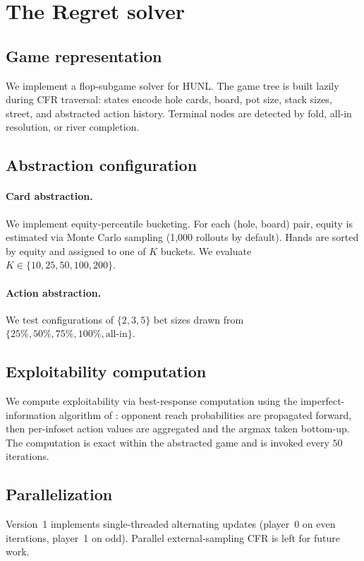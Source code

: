 \section{The Regret solver}
\label{sec:solver}

\subsection{Game representation}

We implement a flop-subgame solver for HUNL. The game tree is built lazily
during CFR traversal: states encode hole cards, board, pot size, stack
sizes, street, and abstracted action history. Terminal nodes are detected
by fold, all-in resolution, or river completion.

\subsection{Abstraction configuration}

\paragraph{Card abstraction.} We implement equity-percentile bucketing.
For each (hole, board) pair, equity is estimated via Monte Carlo sampling
(1{,}000 rollouts by default). Hands are sorted by equity and assigned to
one of $K$ buckets. We evaluate $K \in \{10, 25, 50, 100, 200\}$.

\paragraph{Action abstraction.} We test configurations of $\{2, 3, 5\}$
bet sizes drawn from $\{25\%, 50\%, 75\%, 100\%, \mathrm{all\text{-}in}\}$.

\subsection{Exploitability computation}

We compute exploitability via best-response computation using the
imperfect-information algorithm of \citet{johanson2011efficient}: opponent
reach probabilities are propagated forward, then per-infoset action values
are aggregated and the argmax taken bottom-up. The computation is exact
within the abstracted game and is invoked every $50$ iterations.

\subsection{Parallelization}

Version~1 implements single-threaded alternating updates (player~0 on even
iterations, player~1 on odd). Parallel external-sampling CFR is left for
future work.
